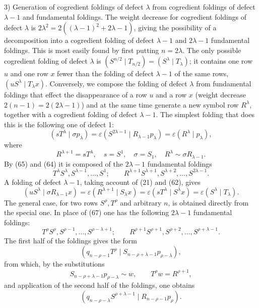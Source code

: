 \documentclass[10pt]{article}
\newcommand{\pair}[2]{(#1\mid #2)}
\newcommand{\eps}{\varepsilon}
\begin{document}
3) Generation of cogredient foldings of defect $\lambda$ from cogredient
foldings of defect $\lambda-1$ and fundamental foldings. The weight decrease
for cogredient foldings of defect $\lambda$ is
$2\lambda^2=2((\lambda-1)^2+2\lambda-1)$, giving the possibility of a
decomposition into a cogredient folding of defect $\lambda-1$ and
$2\lambda-1$ fundamental foldings. This is most easily found by first
putting $n=2\lambda$. The only possible cogredient folding of defect
$\lambda$ is
$\pair{S^{n/2}}{T_{n/2}}=\pair{S^\lambda}{T_\lambda}$; it contains one row
$u$ and one row $x$ fewer than the folding of defect $\lambda-1$ of the same
rows, $\pair{uS^\lambda}{T_\lambda x}$. Conversely, we compose the folding
of defect $\lambda$ from fundamental foldings that effect the disappearance
of a row $u$ and a row $x$ (weight decrease
$2(n-1)=2(2\lambda-1)$) and at the same time generate a new symbol row
$R^\lambda$, together with a cogredient folding of defect $\lambda-1$. The
simplest folding that does this is the following one of defect 1:
\[
 \pair{sT^\lambda}{\sigma p_\lambda}
 =\eps\pair{S^{2\lambda-1}}{R_{\lambda-1}p_\lambda}
 =\eps\pair{R^\lambda}{p_\lambda},
\]
where
\[
 R^{\lambda+1}=sT^\lambda,\quad s=S^1,\quad \sigma=S_1,
 \quad R^\lambda\sim\sigma R_{\lambda-1}.
\]
By (65) and (64) it is composed of the $2\lambda-1$ fundamental foldings
\begin{equation}
 T^\lambda S^\lambda,S^{\lambda-1},\ldots,S^1;
 \qquad R^{\lambda+1}S^{\lambda+1},S^{\lambda+2},\ldots,S^{2\lambda-1}.
\tag{67}
\end{equation}
A folding of defect $\lambda-1$, taking account of (21) and (62), gives
\[
 \pair{uS^\lambda}{\sigma R_{\lambda-1}x}
 =\eps\pair{R^{\lambda+1}}{S_\lambda x}
 =\eps\pair{sT^\lambda}{S^\lambda x}
 =\eps\pair{S^\lambda}{T_\lambda}.
\]
The general case, for two rows $S^\rho,T^\rho$ and arbitrary $n$, is
obtained directly from the special one. In place of (67) one has the
following $2\lambda-1$ fundamental foldings:
\begin{equation}
 T^\rho S^\rho,S^{\rho-1},\ldots,S^{\rho-\lambda+1};
 \qquad R^{\rho+1}S^{\rho+1},S^{\rho+2},\ldots,S^{\rho+\lambda-1}.
\tag{68}
\end{equation}
The first half of the foldings gives the form
\[
 \pair{q_{n-\rho-1}T^\rho}{S_{n-\rho+\lambda-1}p_{\rho-\lambda}},
\]
from which, by the substitutions
\[
 S_{n-\rho+\lambda-1}p_{\rho-\lambda}\sim w,
 \qquad T^\rho w=R^{\rho+1},
\]
and application of the second half of the foldings, one obtains
\[
 \pair{q_{n-\rho-\lambda}S^{\rho+\lambda-1}}{R_{n-\rho-1}p_\rho}.
\]
\end{document}
